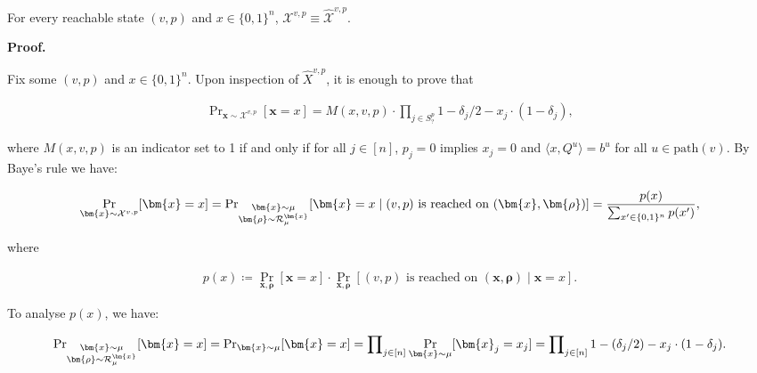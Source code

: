 \documentclass[10pt,a4paper]{article}
\begin{document}
For every reachable state $(v,p)$ and $x\in\{0,1\}^{n}$, $\mathcal{X}^{v,p}\equiv\widehat{\mathcal{X}}^{v,p}$.\par







\par\medskip\noindent\textbf{
\textbf{Proof}.}\par




Fix some $(v,p)$ and $x\in\{0,1\}^{n}$. Upon inspection of $\widehat{X}^{v,p}$, it is enough to prove that\par


\[\begin{gathered}
\Pr\nolimits_{\bm{x}\sim\mathcal{X}^{v,p}}[\bm{x}=x]=M(x,v,p)\cdot\prod\nolimits_{j\in S^{p}_{?}}1-\delta_{j}/2-x_{j}\cdot(1-\delta_{j}),
\end{gathered}\]


where $M(x,v,p)$ is an indicator set to 1 if and only if for all $j\in[n]$, $p_{j}=0$ implies $x_{j}=0$ and $\langle x,Q^{u}\rangle=b^{u}$ for all $u\in\mathrm{path}(v)$.
By Baye’s rule we have:\par


\[\begin{gathered}
\Pr_{\bm{x}\sim\mathcal{X}^{v,p}}[\bm{x}=x]=\Pr\nolimits_{\begin{subarray}{c}\bm{x}\sim\mu\\
\bm{\rho}\sim\mathcal{R}_{\mu}^{\bm{x}}\end{subarray}}[\bm{x}=x\mid\text{$(v,p)$ is reached on $(\bm{x},\bm{\rho})$}]=\frac{p(x)}{\sum_{x^{\prime}\in\{0,1\}^{n}}p(x^{\prime})},
\end{gathered}\]


where\par


\[\begin{gathered}
p(x)\coloneqq\Pr_{\bm{x},\bm{\rho}}[\bm{x}=x]\cdot\Pr_{\bm{x},\bm{\rho}}[\text{$(v,p)$ is reached on $(\bm{x},\bm{\rho})$}\mid\bm{x}=x].
\end{gathered}\]


To analyse $p(x)$, we have:\par


\[\begin{gathered}
\Pr\nolimits_{\begin{subarray}{c}\bm{x}\sim\mu\\
\bm{\rho}\sim\mathcal{R}_{\mu}^{\bm{x}}\end{subarray}}[\bm{x}=x]=\Pr\nolimits_{\bm{x}\sim\mu}[\bm{x}=x]=\prod\nolimits_{j\in[n]}\Pr_{\bm{x}\sim\mu}[\bm{x}_{j}=x_{j}]=\prod\nolimits_{j\in[n]}1-(\delta_{j}/2)-x_{j}\cdot(1-\delta_{j}).
\end{gathered}\]
\end{document}
